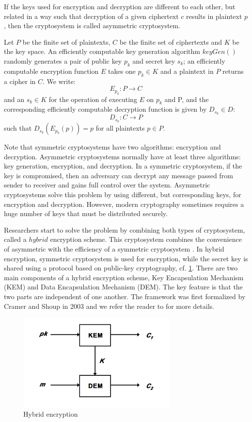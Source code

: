 If the keys used for encryption and decryption are different to each other, but related in a way such that  decryption of a given ciphertext $c$ results in plaintext $p$, then the cryptosystem is called asymmetric cryptosystem.

\begin{mydef} 
	Let $P$ be the finite set of plaintexts, $C$ be the finite set of ciphertexts and $K$ be the key space. An efficiently computable key generation algorithm $keyGen()$ randomly generates a pair of public key $p_{k}$ and secret key $s_{k}$; an efficiently computable encryption function 
	$E$ takes one $p_{k} \in K$ and a plaintext in $P$ returns a cipher in $C$. We write: $$E_{p_{k}} : P \rightarrow C $$ and an $s_{k} \in K$ for the operation of executing $E$ on $p_{k}$ and P, and the corresponding efficiently computable decryption function is given by $D_{s_{k}} \in D$: $$ D_{s_{k}} : C \rightarrow P$$ such that $D_{s_{k}}(E_{p_{k}}(p)) = p $ for all plaintexts $p \in P$.
\end{mydef}
Note that symmetric cryptosystems have two algorithms: encryption and decryption. Asymmetric cryptosystems normally have at least three algorithms: key generation, encryption, and decryption. In a symmetric cryptosystem, if the key is compromised, then an adversary can decrypt any message passed from sender to receiver and gains full control over the system. Asymmetric cryptosystems solve this problem by using different, but corresponding keys, for encryption and decryption. However, modern cryptography sometimes requires a huge number of keys that must be distributed securely. 

Researchers start to solve the problem by combining both types of cryptosystem, called a $hybrid$ encryption scheme. This cryptosystem combines the convenience of asymmetric with the efficiency of a symmetric cryptosystem \cite{simmons1992contemporary}. In hybrid encryption, symmetric cryptosystem is used for encryption, while the secret key is shared using a protocol based on public-key cryptography, cf. \ref{hybird}. There are two main components of a hybrid encryption scheme, Key Encapsulation Mechanism (KEM) and Data Encapsulation Mechanism (DEM). The key feature is that the two parts are independent of one another. The framework was first formalized by Cramer and Shoup in 2003 and we refer the reader to \cite{cramer2003design} for more details.
\begin{figure}[h!]
	\centering
	\includegraphics[width=80mm]{./pics/HybridEnc.png}
	\caption{Hybrid encryption}
	\label{hybird}
\end{figure}
